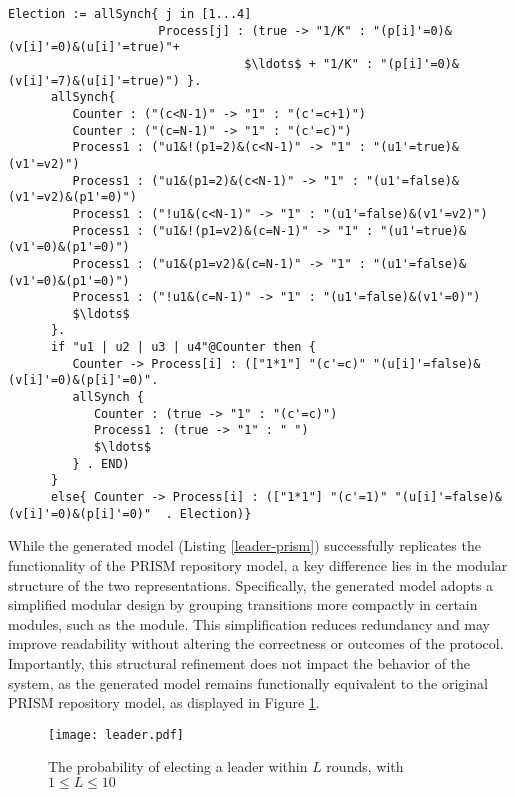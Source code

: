 \begin{lstlisting}[style=chor-color,caption={Choreography for the Synchronous Leader Election Protocol},captionpos=b,label={leader-code}]
   Election := allSynch{ j in [1...4]
                     Process[j] : (true -> "1/K" : "(p[i]'=0)&(v[i]'=0)&(u[i]'=true)"+ 
                                 $\ldots$ + "1/K" : "(p[i]'=0)&(v[i]'=7)&(u[i]'=true)") }.
      allSynch{
         Counter : ("(c<N-1)" -> "1" : "(c'=c+1)")
         Counter : ("(c=N-1)" -> "1" : "(c'=c)")
         Process1 : ("u1&!(p1=2)&(c<N-1)" -> "1" : "(u1'=true)&(v1'=v2)")
         Process1 : ("u1&(p1=2)&(c<N-1)" -> "1" : "(u1'=false)&(v1'=v2)&(p1'=0)")
         Process1 : ("!u1&(c<N-1)" -> "1" : "(u1'=false)&(v1'=v2)")
         Process1 : ("u1&!(p1=v2)&(c=N-1)" -> "1" : "(u1'=true)&(v1'=0)&(p1'=0)")
         Process1 : ("u1&(p1=v2)&(c=N-1)" -> "1" : "(u1'=false)&(v1'=0)&(p1'=0)")
         Process1 : ("!u1&(c=N-1)" -> "1" : "(u1'=false)&(v1'=0)")
         $\ldots$
      }.
      if "u1 | u2 | u3 | u4"@Counter then {
         Counter -> Process[i] : (["1*1"] "(c'=c)" "(u[i]'=false)&(v[i]'=0)&(p[i]'=0)". 
         allSynch {
            Counter : (true -> "1" : "(c'=c)")
            Process1 : (true -> "1" : " ")
            $\ldots$               
         } . END)
      }
      else{ Counter -> Process[i] : (["1*1"] "(c'=1)" "(u[i]'=false)&(v[i]'=0)&(p[i]'=0)"  . Election)}      
   \end{lstlisting} 
   While the generated model (Listing \ref{leader-prism}) successfully replicates the functionality of 
   the PRISM repository model, a key difference lies in the modular 
   structure of the two representations. 
   Specifically, the generated model adopts a simplified modular design by 
   grouping transitions more compactly in certain modules, such as the  module. 
   This simplification reduces redundancy and may improve readability without altering the correctness or outcomes of the protocol. Importantly, this structural refinement does not impact the behavior of the system, as the generated model remains functionally equivalent to the original PRISM repository model, as displayed in Figure \ref{leader-res}.
   \begin{figure}[h]
      \centering
      \texttt{[image: leader.pdf]}	
      \caption{The probability of electing a leader within $L$ rounds, with $1 \leq L \leq 10$}
      \label{leader-res}
      \end{figure}
